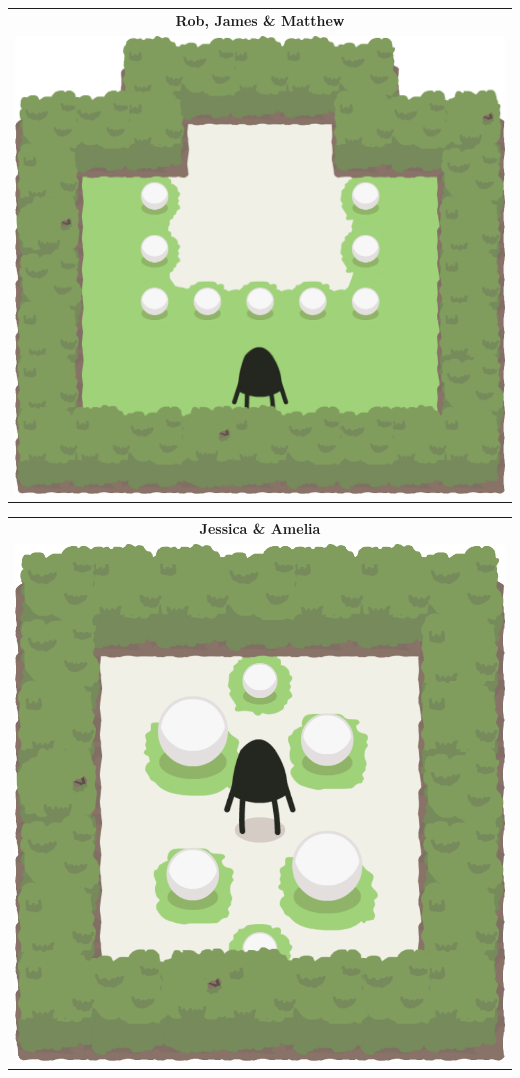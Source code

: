 \documentclass{report}
\theoremstyle{plain}
\begin{document}
\begin{center}
\begin{tabular}{c}
\end{tabular}
\begin{tabular}{c}
\textbf{Rob, James \& Matthew} \\
\includegraphics[scale=\levelAnnexWidth]{rob-james-matthew-1.png}
\end{tabular}
\begin{tabular}{c}
\textbf{Jessica \& Amelia} \\
\includegraphics[scale=\levelAnnexWidth]{jessica-amelia-1.png}

\end{tabular}
\end{center}
\end{document}
